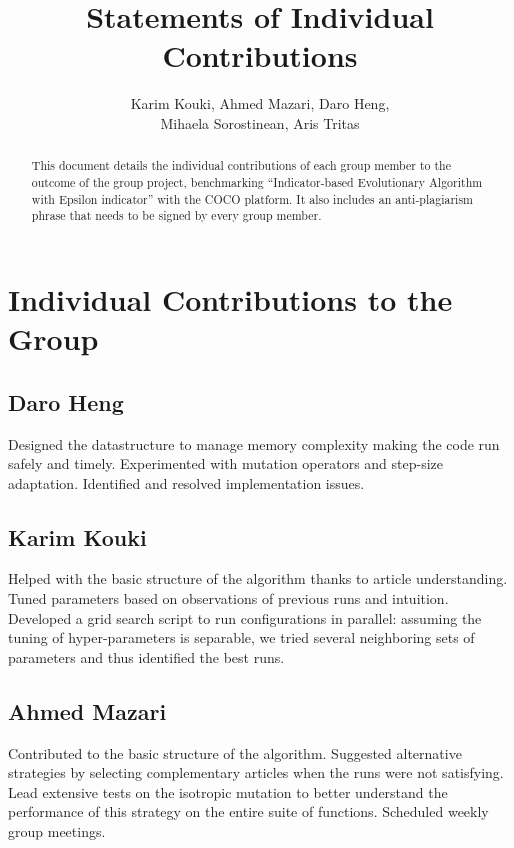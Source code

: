 \documentclass{article}
\begin{document}
\title{Statements of Individual Contributions}
\author{Karim Kouki, Ahmed Mazari, Daro Heng, \\ Mihaela Sorostinean, Aris Tritas}
\maketitle
\begin{abstract}
This document details the individual contributions of each group member to the outcome of the group project, benchmarking ``Indicator-based Evolutionary Algorithm with Epsilon indicator'' with the COCO platform. It also includes an anti-plagiarism phrase that needs to be signed by every group member.
\end{abstract}


\section*{Individual Contributions to the Group}

\subsection*{Daro Heng}
Designed the datastructure to manage memory complexity making the code run safely and timely. 
Experimented with mutation operators and step-size adaptation. Identified and resolved implementation issues.

\subsection*{Karim Kouki}
Helped with the basic structure of the algorithm thanks to article understanding. 
Tuned parameters based on observations of previous runs and intuition. 
Developed a grid search script to run configurations in parallel: assuming the tuning of hyper-parameters is separable, we tried several neighboring sets of parameters and thus identified the best runs.

\subsection*{Ahmed Mazari}
Contributed to the basic structure of the algorithm. 
Suggested alternative strategies by selecting complementary articles when the runs were not satisfying. 
Lead extensive tests on the isotropic mutation to better understand the performance of this strategy on the entire suite of functions. 
Scheduled weekly group meetings.
\end{document}
